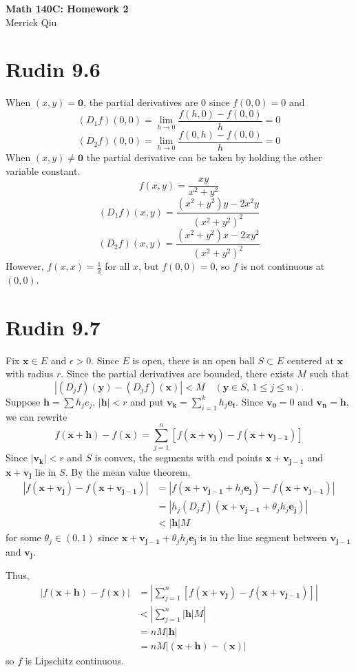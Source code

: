 \documentclass{article}
\begin{document}
\begin{center}
	\huge{\bf Math 140C: Homework 2} \\
	Merrick Qiu
\end{center}

\section*{Rudin 9.6}
When $(x,y) = \bm{0}$, the partial derivatives are $0$ since $f(0,0) = 0$ and
\[
  (D_1 f)(0, 0) = \lim_{h \to 0} \frac{f(h,0) - f(0,0)}{h} = 0
\]
\[
  (D_2 f)(0, 0) = \lim_{h \to 0} \frac{f(0,h) - f(0,0)}{h} = 0
\]
When $(x,y) \neq \bm{0}$ the partial derivative can be taken by holding the other variable constant.
\[
  f(x,y) = \frac{xy}{x^2+y^2}
\]
\[
  (D_1 f)(x, y) = \frac{(x^2+y^2)y - 2x^2y}{(x^2+y^2)^2}
\]
\[
  (D_2 f)(x, y) = \frac{(x^2+y^2)x - 2xy^2}{(x^2+y^2)^2}
\]
However, $f(x,x) = \frac{1}{2}$ for all $x$, but $f(0,0) = 0$,
so $f$ is not continuous at $(0,0)$.
\newpage 

\section*{Rudin 9.7}
Fix $\bm{x} \in E$ and $\epsilon > 0$.
Since $E$ is open, there is an open ball $S \subset E$
centered at $\bm{x}$ with radius $r$.
Since the partial derivatives are bounded, there exists $M$ such that
\[
  |(D_j f)(\bm{y}) - (D_j f)(\bm{x})| < M \quad (\bm{y} \in S,\, 1\leq j \leq n).
\]
Suppose $\bm{h} = \sum h_j e_j$, $|\bm{h}| < r$ and put $\bm{v_k} = \sum_{i=1}^k h_j \bm{e_i}$.
Since $\bm{v_0} = 0$ and $\bm{v_n} = \bm{h}$, we can rewrite
\[
  f(\bm{x} + \bm{h}) - f(\bm{x}) = \sum_{j=1}^n [f(\bm{x} + \bm{v_j}) - f(\bm{x} + \bm{v_{j-1}})]
\]
Since $|\bm{v_k}| < r$ and $S$ is convex, the segments with end points 
$\bm{x} + \bm{v_{j-1}}$ and $\bm{x} + \bm{v_j}$ lie in $S$.
By the mean value theorem,
\begin{align*}
  |f(\bm{x} + \bm{v_j}) - f(\bm{x} + \bm{v_{j-1}})| &= 
  |f(\bm{x} + \bm{v_{j-1}} + h_j\bm{e_j}) - f(\bm{x} + \bm{v_{j-1}})| \\
  &= |h_j(D_jf)(\bm{x} + \bm{v_{j-1}} + \theta_jh_j\bm{e_j})| \\
  &< |\bm{h}|M
\end{align*}
for some $\theta_j \in (0,1)$ since $\bm{x} + \bm{v_{j-1}} + \theta_jh_j\bm{e_j}$
is in the line segment between $\bm{v_{j-1}}$ and $\bm{v_j}$.

Thus,
\begin{align*}
  | f(\bm{x} + \bm{h}) - f(\bm{x}) |
  &= \left|\sum_{j=1}^n [f(\bm{x} + \bm{v_j}) - f(\bm{x} + \bm{v_{j-1}})] \right| \\
  &< \left| \sum_{j=1}^n |\bm{h}|M \right| \\
  &= nM|\bm{h}| \\
  &= nM|(\bm{x} + \bm{h}) - (\bm{x})|
\end{align*}
so $f$ is Lipschitz continuous.
\newpage 
\end{document}
